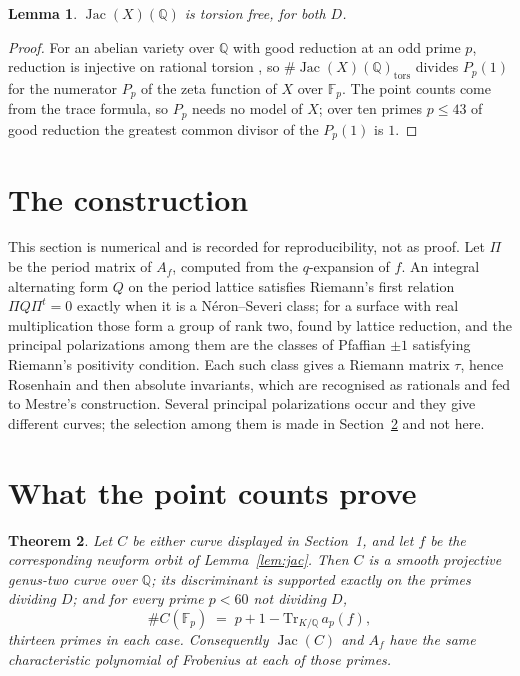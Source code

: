 \documentclass[11pt,reqno]{amsart}
\theoremstyle{plain}
\newtheorem{theorem}{Theorem}
\newtheorem{lemma}[theorem]{Lemma}
\theoremstyle{definition}
\DeclareMathOperator{\Jac}{Jac}
\newcommand{\Q}{\mathbb{Q}}
\newcommand{\F}{\mathbb{F}}
\begin{document}
\begin{lemma}\label{lem:torsion}
$\Jac(X)(\Q)$ is torsion free, for both $D$.
\end{lemma}

\begin{proof}
For an abelian variety over $\Q$ with good reduction at an odd prime $p$, reduction is injective on
rational torsion \cite[Appendix]{katz}, so $\#\Jac(X)(\Q)_{\mathrm{tors}}$ divides $P_p(1)$ for the
numerator $P_p$ of the zeta function of $X$ over $\F_p$. The point counts come from the trace
formula, so $P_p$ needs no model of $X$; over ten primes $p \le 43$ of good reduction the greatest
common divisor of the $P_p(1)$ is $1$.
\end{proof}

\section{The construction}\label{sec:constr}

This section is numerical and is recorded for reproducibility, not as proof. Let $\Pi$ be the
period matrix of $A_f$, computed from the $q$-expansion of $f$. An integral alternating form $Q$ on
the period lattice satisfies Riemann's first relation $\Pi Q \Pi^{t} = 0$ exactly when it is a
N\'eron--Severi class; for a surface with real multiplication those form a group of rank two, found
by lattice reduction, and the principal polarizations among them are the classes of Pfaffian $\pm
1$ satisfying Riemann's positivity condition. Each such class gives a Riemann matrix $\tau$, hence
Rosenhain and then absolute invariants, which are recognised as rationals and fed to Mestre's
construction. Several principal polarizations occur and they give different curves; the selection
among them is made in Section~\ref{sec:counts} and not here.

\section{What the point counts prove}\label{sec:counts}

\begin{theorem}\label{thm:counts}
Let $C$ be either curve displayed in Section~1, and let $f$ be the corresponding newform orbit of
Lemma~\ref{lem:jac}. Then $C$ is a smooth projective genus-two curve over $\Q$; its discriminant is
supported exactly on the primes dividing $D$; and for every prime $p < 60$ not dividing $D$,
\[
  \# C(\F_p) \;=\; p + 1 - \mathrm{Tr}_{K/\Q}\,a_p(f),
\]
thirteen primes in each case. Consequently $\Jac(C)$ and $A_f$ have the same characteristic
polynomial of Frobenius at each of those primes.
\end{theorem}
\end{document}
